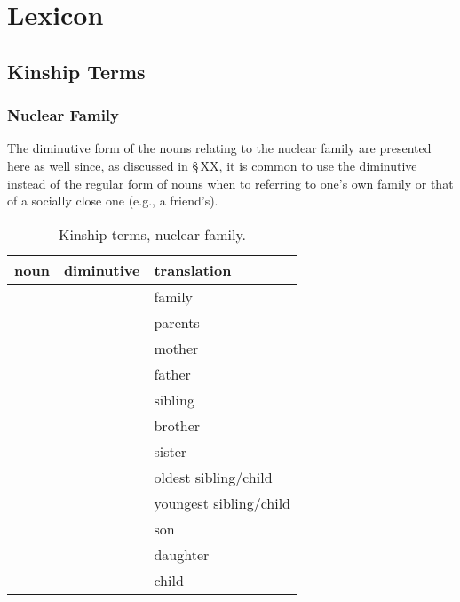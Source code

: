 \chapter{Lexicon}

\section{Kinship Terms}\label{sec:kinship terms}
\subsection{Nuclear Family}\label{sec:nuclear family}

The diminutive form of the nouns relating to the nuclear family are presented here as well since, as discussed in \S\,XX, it is common to use the diminutive instead of the regular form of nouns when to referring to one's own family or that of a socially close one (e.g., a friend's).


\begin{table}[h!]
  \caption{Kinship terms, nuclear family.}
  \label{tbl:kinship}
  \footnotesize\sffamily
  \begin{tabu} to 0.8\textwidth{YYY[1.5]}
  \toprule
  {\sc noun}    & {\sc diminutive} & {\sc translation}\\
  \midrule
      &  & family\\
      &        & parents\\
      &      & mother\\
    &      & father\\
      &      & sibling\\
      &      & brother\\
      &      & sister\\
      &      & oldest sibling/child\\
      &      & youngest sibling/child\\
      &      & son\\
      &      & daughter\\
      &      & child\\

  \bottomrule

  \end{tabu}
\end{table}
